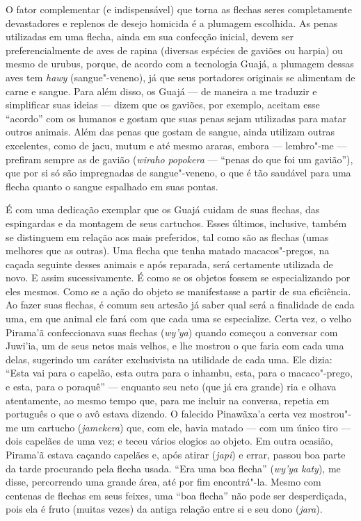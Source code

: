 O fator complementar (e indispensável) que torna as flechas seres
completamente devastadores e replenos de desejo homicida é a plumagem
escolhida. As penas utilizadas em uma flecha, ainda em sua confecção
inicial, devem ser preferencialmente de aves de rapina (diversas
espécies de gaviões ou harpia) ou mesmo de urubus, porque, de acordo com
a tecnologia Guajá, a plumagem dessas aves tem \emph{hawy}
(sangue"-veneno), já que seus portadores originais se alimentam de carne
e sangue. Para além disso, os Guajá --- de maneira a me traduzir e
simplificar suas ideias --- dizem que os gaviões, por exemplo, aceitam
esse ``acordo'' com os humanos e gostam que suas penas sejam utilizadas
para matar outros animais. Além das penas que gostam de sangue, ainda
utilizam outras excelentes, como de jacu, mutum e até mesmo araras,
embora --- lembro"-me --- prefiram sempre as de gavião (\emph{wiraho}
\emph{popokera} --- ``penas do que foi um gavião''), que por si só são
impregnadas de sangue"-veneno, o que é tão saudável para uma flecha
quanto o sangue espalhado em suas pontas.

É com uma dedicação exemplar que os Guajá cuidam de suas flechas, das
espingardas e da montagem de seus cartuchos. Esses últimos, inclusive,
também se distinguem em relação aos mais preferidos, tal como são as
flechas (umas melhores que as outras). Uma flecha que tenha matado
macacos"-pregos, na caçada seguinte desses animais e após reparada, será
certamente utilizada de novo. E assim sucessivamente. É como se os
objetos fossem se especializando por eles mesmos. Como se a ação do
objeto se manifestasse a partir de sua eficiência. Ao fazer suas
flechas, é comum seu artesão já saber qual será a finalidade de cada
uma, em que animal ele fará com que cada uma se especialize. Certa vez,
o velho Pirama'ã confeccionava suas flechas (\emph{wy'ya}) quando
começou a conversar com Juwi'ia, um de seus netos mais velhos, e lhe
mostrou o que faria com cada uma delas, sugerindo um caráter
exclusivista na utilidade de cada uma. Ele dizia: ``Esta vai para o
capelão, esta outra para o inhambu, esta, para o macaco"-prego, e esta,
para o poraquê'' --- enquanto seu neto (que já era grande) ria e olhava
atentamente, ao mesmo tempo que, para me incluir na conversa, repetia em
português o que o avô estava dizendo. O falecido Pinawãxa'a certa vez
mostrou"-me um cartucho (\emph{jamekera}) que, com ele, havia matado ---
com um único tiro --- dois capelães de uma vez; e teceu vários elogios ao
objeto. Em outra ocasião, Pirama'ã estava caçando capelães e, após
atirar (\emph{japi}) e errar, passou boa parte da tarde procurando pela
flecha usada. ``Era uma boa flecha'' (\emph{wy'ya} \emph{katy}), me disse,
percorrendo uma grande área, até por fim encontrá"-la. Mesmo com centenas
de flechas em seus feixes, uma ``boa flecha'' não pode ser desperdiçada,
pois ela é fruto (muitas vezes) da antiga relação entre si e seu dono
(\emph{jara}).

